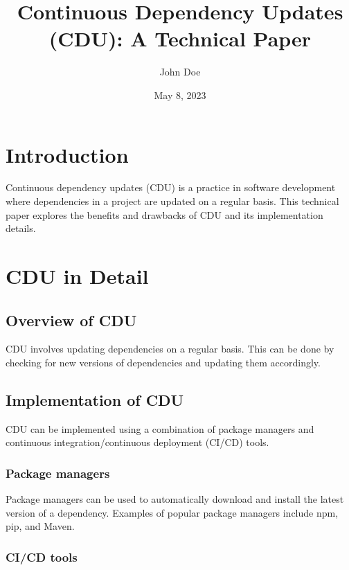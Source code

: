 \documentclass{article}
\begin{document}
\title{Continuous Dependency Updates (CDU): A Technical Paper}
\author{John Doe}
\date{May 8, 2023}
\maketitle

\section{Introduction}
\label{sec:introduction}
Continuous dependency updates (CDU) is a practice in software development where dependencies in a project are updated on a regular basis. This technical paper explores the benefits and drawbacks of CDU and its implementation details.

\section{CDU in Detail}
\label{sec:cdu-in-detail}

\subsection{Overview of CDU}
\label{subsec:overview-of-cdu}

CDU involves updating dependencies on a regular basis. This can be done by checking for new versions of dependencies and updating them accordingly.

\subsection{Implementation of CDU}
\label{subsec:implementation-of-cdu}

CDU can be implemented using a combination of package managers and continuous integration/continuous deployment (CI/CD) tools.

\subsubsection{Package managers}
\label{subsubsec:package-managers}

Package managers can be used to automatically download and install the latest version of a dependency. Examples of popular package managers include npm, pip, and Maven.

\subsubsection{CI/CD tools}
\label{subsubsec:cicd-tools}
\end{document}
